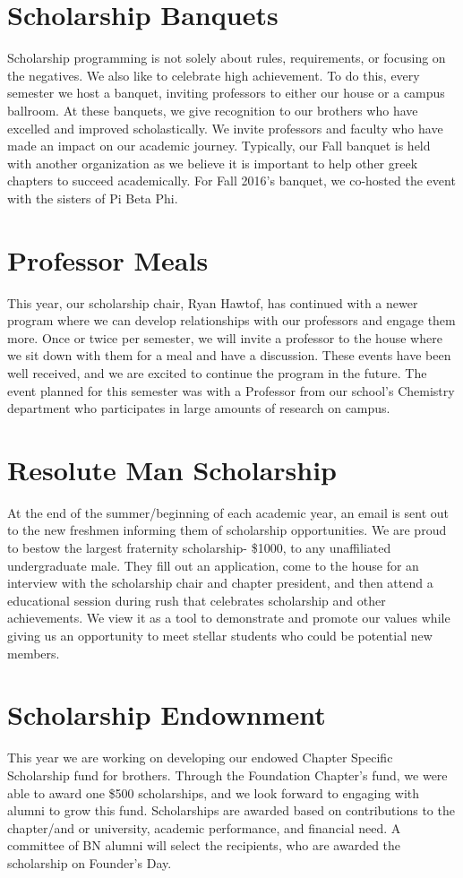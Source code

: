   \section*{Scholarship Banquets}
    Scholarship programming is not solely about rules, requirements, or focusing on the negatives. We also like to celebrate high achievement. To do this, every semester we host a banquet, inviting professors to either our house or a campus ballroom. At these banquets, we give recognition to our brothers who have excelled and improved scholastically. We invite professors and faculty who have made an impact on our academic journey. Typically, our Fall banquet is held with another organization as we believe it is important to help other greek chapters to succeed academically. For Fall 2016’s banquet, we co-hosted the event with the sisters of Pi Beta Phi.

  \section*{Professor Meals}
	This year, our scholarship chair, Ryan Hawtof, has continued with a newer program where we can develop relationships with our professors and engage them more. Once or twice per semester, we will invite a professor to the house where we sit down with them for a meal and have a discussion. These events have been well received, and we are excited to continue the program in the future. The event planned for this semester was with a Professor from our school’s Chemistry department who participates in large amounts of research on campus.
    
  \section*{Resolute Man Scholarship}
    At the end of the summer/beginning of each academic year, an email is sent out to the new freshmen informing them of scholarship opportunities. We are proud to bestow the largest fraternity scholarship- \$1000, to any unaffiliated undergraduate male. They fill out an application, come to the house for an interview with the scholarship chair and chapter president, and then attend a educational session during rush that celebrates scholarship and other achievements. We view it as a tool to demonstrate and promote our values while giving us an opportunity to meet stellar students who could be potential new members.
    
  \section*{Scholarship Endownment}  
    This year we are working on developing our endowed Chapter Specific Scholarship fund for brothers. Through the Foundation Chapter’s fund, we were able to award one \$500 scholarships, and we look forward to engaging with alumni to grow this fund. Scholarships are awarded based on contributions to the chapter/and or university, academic performance, and financial need. A committee of BN alumni will select the recipients, who are awarded the scholarship on Founder’s Day.
        
